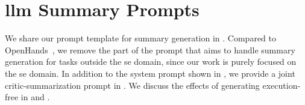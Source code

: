 \documentclass{article}
\begin{document}
\section{\ac{llm} Summary Prompts}
\label{appendix:llm-summary-prompt}
We share our prompt template for summary generation in . Compared to OpenHands~\cite{wang2025openhands}, we remove the part of the prompt that aims to handle summary generation for tasks outside the \ac{se} domain, since our work is purely focused on the \ac{se} domain. In addition to the system prompt shown in , we provide a joint critic-summarization prompt in . We discuss the effects of generating execution-free in  and .
\end{document}
